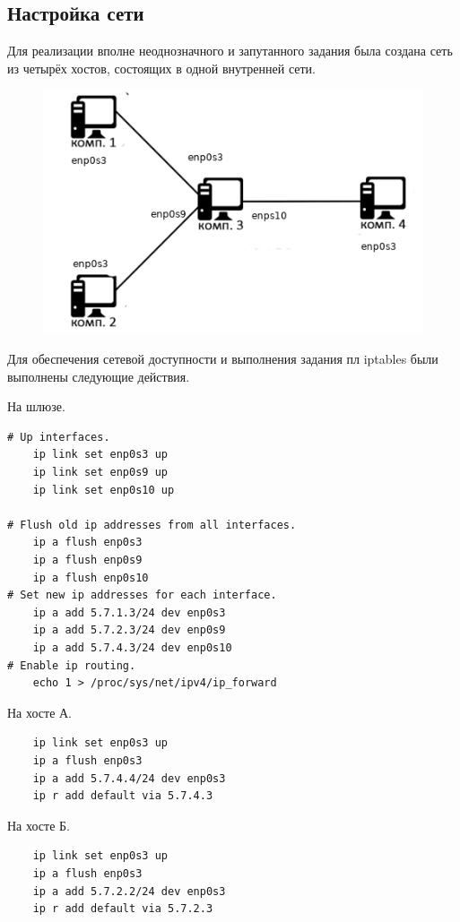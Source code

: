 \documentclass[11pt, a4paper] {ncc}
\begin{document}
    \subsection*{Настройка сети}
        Для реализации вполне неоднозначного и запутанного задания была создана сеть из четырёх
        хостов, состоящих в одной внутренней сети.
        \begin{figure}[h!]
            \includegraphics[scale=0.5]{./base.png}
        \end{figure}

        Для обеспечения сетевой доступности и выполнения задания пл iptables были 
        выполнены следующие действия.

        На шлюзе.
\begin{verbatim}
# Up interfaces.
    ip link set enp0s3 up
    ip link set enp0s9 up
    ip link set enp0s10 up

# Flush old ip addresses from all interfaces.
    ip a flush enp0s3
    ip a flush enp0s9
    ip a flush enp0s10
# Set new ip addresses for each interface.
    ip a add 5.7.1.3/24 dev enp0s3
    ip a add 5.7.2.3/24 dev enp0s9
    ip a add 5.7.4.3/24 dev enp0s10
# Enable ip routing.
    echo 1 > /proc/sys/net/ipv4/ip_forward
\end{verbatim}

    На хосте А.
\begin{verbatim}
    ip link set enp0s3 up
    ip a flush enp0s3
    ip a add 5.7.4.4/24 dev enp0s3
    ip r add default via 5.7.4.3
\end{verbatim}

    На хосте Б.
\begin{verbatim}
    ip link set enp0s3 up
    ip a flush enp0s3
    ip a add 5.7.2.2/24 dev enp0s3
    ip r add default via 5.7.2.3

\end{verbatim}
\end{document}
